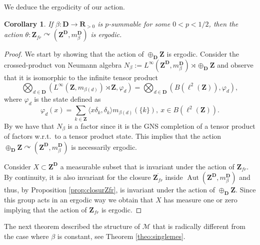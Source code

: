\documentclass[a4paper,12pt]{amsart}
\numberwithin{equation}{section}
\newtheorem{corollary}[theo]{Corollary}
\theoremstyle{definition}
\newcommand{\act}{\curvearrowright}
\DeclareMathOperator{\Aut}{Aut}
\newcommand{\D}{\mathbf D}
\newcommand{\scrM}{\mathscr M}
\newcommand{\mbD}{m_\beta^\D}
\newcommand{\R}{\mathbf{R}}
\newcommand{\Z}{\mathbf{Z}}
\begin{document}
We deduce the ergodicity of our action.

\begin{corollary}\label{coro:ergodicZfr}
If $\beta:\D\to \R_{>0}$ is $p$-summable for some $0< p < 1/2$, then the action $\theta:\Z_{fr}\act (\Z^\D,\mbD)$ is ergodic.
\end{corollary}

\begin{proof}
We start by showing that the action of $\oplus_\D \Z$ is ergodic.
Consider the crossed-product von Neumann algebra $N_\beta:= L^\infty(\Z^\D, \mbD)\rtimes \oplus_\D\Z$ and observe that it is isomorphic to the infinite tensor product $$\bigotimes_{d\in\D} (L^\infty(\Z , m_{\beta(d)})\rtimes \Z , \varphi_d) = \bigotimes_{d\in\D} (B(\ell^2(\Z)) , \varphi_d),$$
where $\varphi_d$ is the state defined as 
$$\varphi_d(x) = \sum_{k\in\Z} \langle x \delta_k,\delta_k\rangle m_{\beta(d)}(\{k\}), \ x\in B(\ell^2(\Z)).$$
By \cite[XIV, Corollary 1.10]{TakesakiIII} we have that $N_\beta$ is a factor since it is the GNS completion of a tensor product of factors w.r.t.~to a tensor product state.
This implies that the action $\oplus_\D\Z\act (\Z^\D,\mbD)$ is necessarily ergodic.
 
Consider $X\subset \Z^\D$ a measurable subset that is invariant under the action of $\Z_{fr}$.
By continuity, it is also invariant for the closure $\overline{\Z_{fr}}$ inside $\Aut(\Z^\D, \mbD)$ and thus, by Proposition \ref{prop:closurZfr}, is invariant under the action of $\oplus_\D \Z$.
Since this group acts in an ergodic way we obtain that $X$ has measure one or zero implying that the action of $\Z_{fr}$ is ergodic.
\end{proof}

The next theorem described the structure of $\scrM$ that is radically different from the case where $\beta$ is constant, see Theorem \ref{theo:singlemes}.
\end{document}
